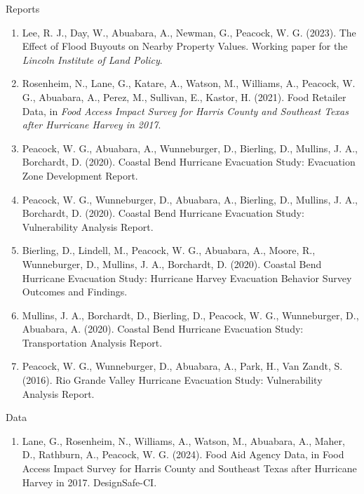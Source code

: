 \documentclass[11pt,oneside]{article}
\begin{document}
{Reports}
\begin{enumerate}[leftmargin=20pt]
\item Lee, R. J., Day, W., Abuabara, A., Newman, G., Peacock, W. G. (2023). The Effect of Flood Buyouts on Nearby Property Values. Working paper for the \emph{Lincoln Institute of Land Policy}.
\item Rosenheim, N., Lane, G., Katare, A., Watson, M., Williams, A., Peacock, W. G., Abuabara, A., Perez, M., Sullivan, E., Kastor, H. (2021). Food Retailer Data, in \emph{Food Access Impact Survey for Harris County and Southeast Texas after Hurricane Harvey in 2017}.
\item Peacock, W. G., Abuabara, A., Wunneburger, D., Bierling, D., Mullins, J. A., Borchardt, D. (2020). Coastal Bend Hurricane Evacuation Study: Evacuation Zone Development Report.
\item Peacock, W. G., Wunneburger, D., Abuabara, A., Bierling, D., Mullins, J. A., Borchardt, D. (2020). Coastal Bend Hurricane Evacuation Study: Vulnerability Analysis Report.
\item Bierling, D., Lindell, M., Peacock, W. G., Abuabara, A., Moore, R., Wunneburger, D., Mullins, J. A., Borchardt, D. (2020). Coastal Bend Hurricane Evacuation Study: Hurricane Harvey Evacuation Behavior Survey Outcomes and Findings.
\item Mullins, J. A., Borchardt, D., Bierling, D., Peacock, W. G., Wunneburger, D., Abuabara, A. (2020). Coastal Bend Hurricane Evacuation Study: Transportation Analysis Report.
\item Peacock, W. G., Wunneburger, D., Abuabara, A., Park, H., Van Zandt, S. (2016). Rio Grande Valley Hurricane Evacuation Study: Vulnerability Analysis Report.
\end{enumerate}

\vspace{1pt}

{Data}
\begin{enumerate}[leftmargin=20pt]
\item Lane, G., Rosenheim, N., Williams, A., Watson, M., Abuabara, A., Maher, D., Rathburn, A., Peacock, W. G. (2024). Food Aid Agency Data, in Food Access Impact Survey for Harris County and Southeast Texas after Hurricane Harvey in 2017. DesignSafe-CI.
\end{enumerate}

\vspace{1pt}
\end{document}
